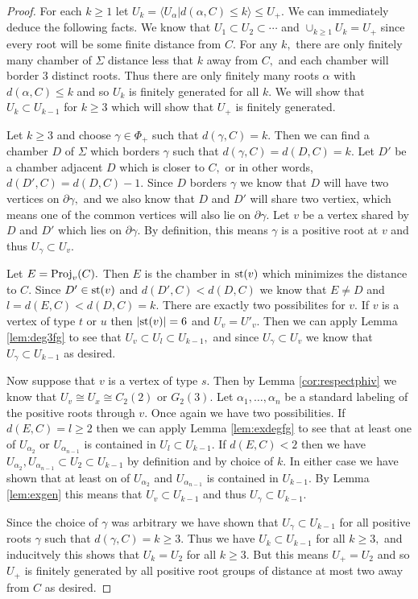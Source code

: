 \documentclass[class=book, crop=false]{standalone}
\begin{document}
\begin{proof}
	For each $k\ge 1$ let $U_k=\langle U_\alpha|d(\alpha,C)\le k\rangle\le U_+.$ We can immediately deduce the following facts. We know that $U_1\subset U_2\subset \cdots$  and $\cup_{k\ge 1} U_k=U_+$ since every root will be some finite distance from $C.$ For any $k,$ there are only finitely many chamber of $\Sigma$ distance less that $k$ away from $C,$ and each chamber will border 3 distinct roots. Thus there are only finitely many roots $\alpha$ with $d(\alpha,C)\le k$ and so $U_k$ is finitely generated for all $k.$ We will show that $U_k\subset U_{k-1}$ for $k\ge 3$ which will show that $U_+$ is finitely generated.

	Let $k\ge 3$ and choose $\gamma\in \Phi_+$ such that $d(\gamma,C)=k.$ Then we can find a chamber $D$ of $\Sigma$ which borders $\gamma$ such that $d(\gamma,C)=d(D,C)=k.$ Let $D'$ be a chamber adjacent $D$ which is closer to $C,$ or in other words, $d(D',C)=d(D,C)-1.$ Since $D$ borders $\gamma$ we know that $D$ will have two vertices on $\partial \gamma,$ and we also know that $D$ and $D'$ will share two vertiex, which means one of the common vertices will also lie on $\partial\gamma.$ Let $v$ be a vertex shared by $D$ and $D'$ which lies on $\partial \gamma.$ By definition, this means $\gamma$ is a positive root at $v$ and thus $U_\gamma\subset U_v.$

	Let $E=\mathrm{Proj}_v(C).$ Then $E$ is the chamber in $\mathrm{st}(v)$ which minimizes the distance to $C.$ Since $D'\in \mathrm{st}(v)$ and $d(D',C)<d(D,C)$ we know that $E\neq D$ and $l=d(E,C)<d(D,C)=k.$ There are exactly two possibilites for $v.$ If $v$ is a vertex of type $t$ or $u$ then $|\mathrm{st}(v)|=6$ and $U_v=U'_v.$ Then we can apply Lemma \ref{lem:deg3fg} to see that $U_v\subset U_l\subset U_{k-1},$ and since $U_\gamma \subset U_v$ we know that $U_\gamma \subset U_{k-1}$ as desired.

	Now suppose that $v$ is a vertex of type $s.$ Then by Lemma \ref{cor:respectphiv} we know that $U_v\cong U_x\cong C_2(2)$ or $G_2(3).$ Let $\alpha_1,\dots,\alpha_n$ be a standard labeling of the positive roots through $v.$ Once again we have two possibilities. If $d(E,C)=l\ge 2$ then we can apply Lemma \ref{lem:exdegfg} to see that at least one of $U_{\alpha_2}$ or $U_{\alpha_{n-1}}$ is contained in $U_l\subset U_{k-1}.$ If $d(E,C)<2$ then we have $U_{\alpha_2},U_{\alpha_{n-1}}\subset U_2\subset U_{k-1}$ by definition and by choice of $k.$ In either case we have shown that at least on of $U_{\alpha_2}$ and $U_{\alpha_{n-1}}$ is contained in $U_{k-1}.$ By Lemma \ref{lem:exgen} this means that $U_v\subset U_{k-1}$ and thus $U_\gamma\subset U_{k-1}.$

	Since the choice of $\gamma$ was arbitrary we have shown that $U_\gamma \subset U_{k-1}$ for all positive roots $\gamma$ such that $d(\gamma,C)=k\ge 3.$ Thus we have $U_k\subset U_{k-1}$ for all $k\ge 3,$ and inducitvely this shows that $U_k=U_2$ for all $k\ge 3.$ But this means $U_+=U_2$ and so $U_+$ is finitely generated by all positive root groups of distance at most two away from $C$ as desired.

\end{proof}
\end{document}

